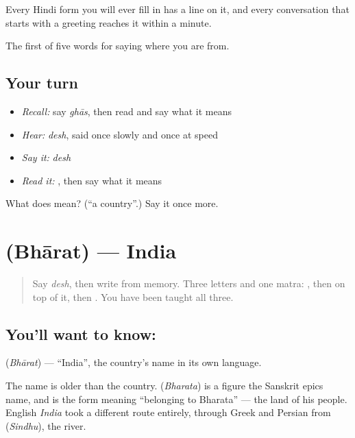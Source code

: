 Every Hindi form you will ever fill in has a  line on it, and every conversation that starts with a greeting reaches it within a minute.

\begin{grammarlens}[title={What you've built}]
The first of five words for saying where you are from.
\end{grammarlens}

\subsection*{Your turn}
\begin{itemize}
\raggedright
  \item \emph{Recall:} say \emph{ghās}, then read \textbf{} and say what it means
  \item \emph{Hear:} \emph{desh}, said once slowly and once at speed
  \item \emph{Say it:} \emph{desh}
  \item \emph{Read it:} , then say what it means
\end{itemize}

\begin{tcolorbox}[breakable,colback=teal!4,colframe=teal!35!black,title={Before you move on}]
What does  mean? (\textquotedblleft{}a country\textquotedblright{}.) Say it once more.
\end{tcolorbox}
\section[Bhārat]{ (Bhārat) — India}

\label{lesson:HI-C68-india}



\begin{quote}
Say \emph{desh}, then write \textbf{} from memory. Three letters and one matra: , then  on top of it, then . You have been taught all three.
\end{quote}

\subsection*{You'll want to know: }
\textbf{} (\emph{Bhārat}) — \textquotedblleft{}India\textquotedblright{}, the country's name in its own language.

The name is older than the country.  (\emph{Bharata}) is a figure the Sanskrit epics name, and  is the form meaning \textquotedblleft{}belonging to Bharata\textquotedblright{} — the land of his people. English \emph{India} took a different route entirely, through Greek and Persian from  (\emph{Sindhu}), the river.

